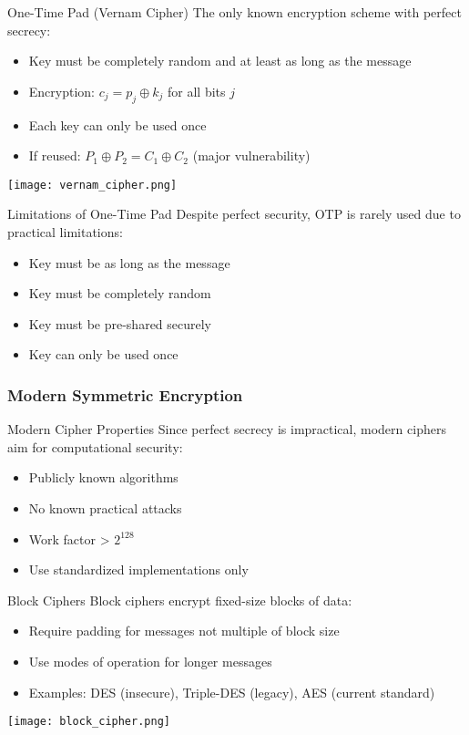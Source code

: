 \begin{concept}{One-Time Pad (Vernam Cipher)}
    The only known encryption scheme with perfect secrecy:
    \begin{itemize}
        \item Key must be completely random and at least as long as the message
        \item Encryption: $c_j = p_j \oplus k_j$ for all bits $j$
        \item Each key can only be used once
        \item If reused: $P_1 \oplus P_2 = C_1 \oplus C_2$ (major vulnerability)
    \end{itemize}
    \texttt{[image: vernam\_cipher.png]}
\end{concept}

\begin{concept}{Limitations of One-Time Pad}
    Despite perfect security, OTP is rarely used due to practical limitations:
    \begin{itemize}
        \item Key must be as long as the message
        \item Key must be completely random
        \item Key must be pre-shared securely
        \item Key can only be used once
    \end{itemize}
\end{concept}

\subsubsection{Modern Symmetric Encryption}

\begin{concept}{Modern Cipher Properties}
    Since perfect secrecy is impractical, modern ciphers aim for computational security:
    \begin{itemize}
        \item Publicly known algorithms
        \item No known practical attacks
        \item Work factor > $2^{128}$
        \item Use standardized implementations only
    \end{itemize}
\end{concept}

\begin{concept}{Block Ciphers}
    Block ciphers encrypt fixed-size blocks of data:
    \begin{itemize}
        \item Require padding for messages not multiple of block size
        \item Use modes of operation for longer messages
        \item Examples: DES (insecure), Triple-DES (legacy), AES (current standard)
    \end{itemize}
    \texttt{[image: block\_cipher.png]}
\end{concept}

